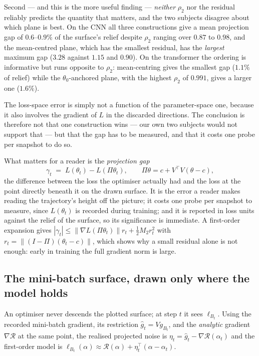 \documentclass[11pt]{article}
\theoremstyle{definition}
\newcommand{\Rec}{\mathcal{R}}
\begin{document}
Second --- and this is the more useful finding --- \emph{neither} $\rho_2$ nor the
residual reliably predicts the quantity that matters, and the two subjects disagree about
which plane is best. On the CNN all three constructions give a mean projection gap of
$0.6$--$0.9\%$ of the surface's relief despite $\rho_2$ ranging over $0.87$ to $0.98$,
and the mean-centred plane, which has the smallest residual, has the \emph{largest}
maximum gap ($3.28$ against $1.15$ and $0.90$). On the transformer the ordering is
informative but runs opposite to $\rho_2$: mean-centring gives the smallest gap
($1.1\%$ of relief) while the $\theta_0$-anchored plane, with the highest $\rho_2$ of
$0.991$, gives a larger one ($1.6\%$).

The loss-space error is simply not a function of the parameter-space one, because it also
involves the gradient of $L$ in the discarded directions. The conclusion is therefore not
that one construction wins --- our own two subjects would not support that --- but that
the gap has to be measured, and that it costs one probe per snapshot to do so.

What matters for a reader is the \emph{projection gap}
\begin{equation}
  \gamma_t \;=\; L(\theta_t)-L(\Pi\theta_t),\qquad \Pi\theta=c+V^\top V(\theta-c),
\end{equation}
the difference between the loss the optimiser actually had and the loss at the point
directly beneath it on the drawn surface. It is the error a reader makes reading the
trajectory's height off the picture; it costs one probe per snapshot to measure, since
$L(\theta_t)$ is recorded during training; and it is reported in loss units against the
relief of the surface, so its significance is immediate. A first-order expansion gives
$|\gamma_t|\le\|\nabla L(\Pi\theta_t)\|r_t+\tfrac12M_2r_t^2$ with
$r_t=\|(I-\Pi)(\theta_t-c)\|$, which shows why a small residual alone is not enough:
early in training the full gradient norm is large.

\subsection{The mini-batch surface, drawn only where the model holds}
\label{sec:animate}

An optimiser never descends the plotted surface; at step $t$ it sees $\ell_{B_t}$. Using
the recorded mini-batch gradient, its restriction $\hat g_t=Vg_{B_t}$, and the
\emph{analytic} gradient $\nabla\Rec$ at the same point, the realised projected noise is
$\eta_t=\hat g_t-\nabla\Rec(\alpha_t)$ and the first-order model is
$\ell_{B_t}(\alpha)\approx\Rec(\alpha)+\eta_t^\top(\alpha-\alpha_t)$.
\end{document}
